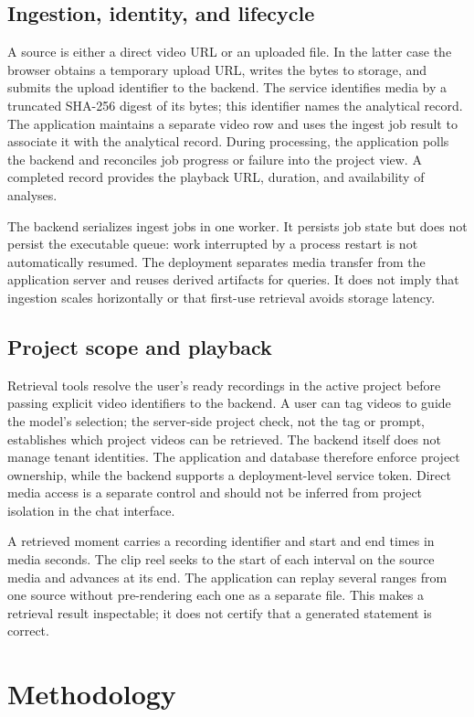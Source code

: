 \documentclass{ieeeaccess}
\begin{document}
\subsection{Ingestion, identity, and lifecycle}
A source is either a direct video URL or an uploaded file. In the latter case the browser obtains a temporary upload URL, writes the bytes to storage, and submits the upload identifier to the backend. The service identifies media by a truncated SHA-256 digest of its bytes; this identifier names the analytical record. The application maintains a separate video row and uses the ingest job result to associate it with the analytical record. During processing, the application polls the backend and reconciles job progress or failure into the project view. A completed record provides the playback URL, duration, and availability of analyses.

The backend serializes ingest jobs in one worker. It persists job state but does not persist the executable queue: work interrupted by a process restart is not automatically resumed. The deployment separates media transfer from the application server and reuses derived artifacts for queries. It does not imply that ingestion scales horizontally or that first-use retrieval avoids storage latency.

\subsection{Project scope and playback}
Retrieval tools resolve the user's ready recordings in the active project before passing explicit video identifiers to the backend. A user can tag videos to guide the model's selection; the server-side project check, not the tag or prompt, establishes which project videos can be retrieved. The backend itself does not manage tenant identities. The application and database therefore enforce project ownership, while the backend supports a deployment-level service token. Direct media access is a separate control and should not be inferred from project isolation in the chat interface.

A retrieved moment carries a recording identifier and start and end times in media seconds. The clip reel seeks to the start of each interval on the source media and advances at its end. The application can replay several ranges from one source without pre-rendering each one as a separate file. This makes a retrieval result inspectable; it does not certify that a generated statement is correct.

\section{Methodology}
\label{sec:method}
\end{document}
